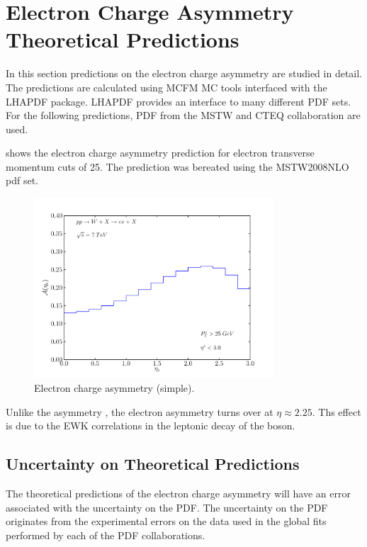 \section{Electron Charge Asymmetry Theoretical Predictions}

In this section predictions on the electron charge asymmetry are studied in detail.
The predictions are calculated using \ac{MCFM}\cite{mcfm} \ac{MC} tools interfaced with the
\ac{LHAPDF} package\cite{lhapdf}. 
\ac{LHAPDF} provides an interface to many different \ac{PDF} sets. For the
following predictions, \ac{PDF} from  the \ac{MSTW} and \ac{CTEQ} collaboration
are used.

 shows the electron charge asymmetry prediction for
electron transverse momentum cuts of \unit{25}{\GeV}. The prediction was
bereated using the MSTW2008NLO \ac{pdf}\cite{mstw} set.

\begin{figure}[htbp]
  \centering
  \includegraphics[width=0.8\textwidth]{lepton-asym}
  \caption{Electron charge asymmetry (simple).}
  \label{wbos:asym_simple}
\end{figure}

Unlike the \PW asymmetry , the electron asymmetry turns over at $\eta\approx
2.25$. Ths effect is due to the \ac{EWK} correlations in the leptonic decay of
the \PW boson.

\subsection{Uncertainty on Theoretical Predictions}
The theoretical predictions of the electron charge asymmetry will have an error
associated with the uncertainty on the \ac{PDF}.
The uncertainty on the \ac{PDF} originates from the experimental errors on the
data used in the global fits performed by each of the \ac{PDF} collaborations.

